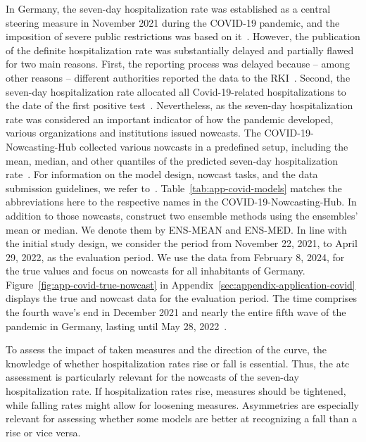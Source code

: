 \documentclass[pdflatex]{sn-jnl}
\theoremstyle{plain}%
\theoremstyle{definition}
\begin{document}
In Germany, the seven-day hospitalization rate was established as a central steering measure in November 2021 during the COVID-19 pandemic, and the imposition of severe public restrictions was based on it~\citep{RobertKochInstitute2021}.
However, the publication of the definite hospitalization rate was substantially delayed and partially flawed for two main reasons.
First, the reporting process was delayed because – among other reasons – different authorities reported the data to the RKI~\citep{RobertKochInstitute2024}.
Second, the seven-day hospitalization rate allocated all Covid-19-related hospitalizations to the date of the first positive test~\parencite[for a detailed description, see][]{Wolffram2023}.
Nevertheless, as the seven-day hospitalization rate was considered an important indicator of how the pandemic developed, various organizations and institutions issued nowcasts.
The COVID-19-Nowcasting-Hub collected various nowcasts in a predefined setup, including the mean, median, and other quantiles of the predicted seven-day hospitalization rate~\citep{ChairOfEconometricsAndStatisticsAtKarlsruheInstituteOfTechnology2024}.
For information on the model design, nowcast tasks, and the data submission guidelines, we refer to~\citet{Wolffram2023}.
Table~\ref{tab:app-covid-models} matches the abbreviations here to the respective names in the COVID-19-Nowcasting-Hub.
In addition to those nowcasts, \citet{Wolffram2023} construct two ensemble methods using the ensembles' mean or median.
We denote them by ENS-MEAN and ENS-MED.
In line with the initial study design, we consider the period from November 22, 2021, to April 29, 2022, as the evaluation period.
We use the data from February 8, 2024, for the true values and focus on nowcasts for all inhabitants of Germany.
Figure~\ref{fig:app-covid-true-nowcast} in Appendix~\ref{sec:appendix-application-covid} displays the true and nowcast data for the evaluation period.
The time comprises the fourth wave's end in December 2021 and nearly the entire fifth wave of the pandemic in Germany, lasting until May 28, 2022~\citep{Tolksdorf2022}.

To assess the impact of taken measures and the direction of the curve, the knowledge of whether hospitalization rates rise or fall is essential.
Thus, the \ac{atc} assessment is particularly relevant for the nowcasts of the seven-day hospitalization rate.
If hospitalization rates rise, measures should be tightened, while falling rates might allow for loosening measures.
Asymmetries are especially relevant for assessing whether some models are better at recognizing a fall than a rise or vice versa.
\end{document}

